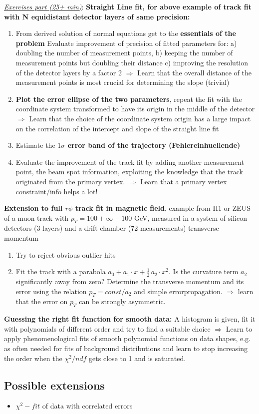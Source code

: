 \documentclass[12pt]{article}
\begin{document}
{\em \underline{Exercises part (25+ min)}}:
{\bf Straight Line fit, for above example of track fit
with N equidistant detector layers of same precision:}
\begin{enumerate}
\item From derived solution of normal equations get to the
{\bf essentials of the problem}
Evaluate improvement of precision of fitted parameters
for: a) doubling the number of measurement points,
b) keeping the number of measurement points but doubling
   their distance
c) improving the resolution of the detector layers by
   a factor 2 
$\Rightarrow$ Learn that the overall distance of the measurement 
points is most crucial for determining the slope (trivial)
\item
{\bf Plot the error ellipse of the two parameters}, repeat the
fit with the coordinate system transformed to have its
origin in the middle of the detector
$\Rightarrow$ Learn that the choice of the coordinate
system origin has a large impact on the correlation of
the intercept and slope of the straight line fit
\item
Estimate the {\bf $1\sigma$ error band of the trajectory 
(Fehlereinhuellende) }
\item 
Evaluate the improvement of the track fit by adding
another measurement point, the beam spot information,
exploiting the knowledge that the track originated
from the primary vertex.
$\Rightarrow$ Learn that a primary vertex constraint/info
helps a lot!
\end{enumerate}
{\bf Extension to full $r\phi$ track fit in magnetic field}, example
from H1 or ZEUS of a muon track with $p_T = 100+\infty - 100$ GeV,
measured in a system of silicon detectors (3 layers) and
a drift chamber (72 measurements)  
transverse momentum
\begin{enumerate}
\item
Try to reject obvious outlier hits
\item
Fit the track with a parabola
$a_0 + a_1 \cdot x + \frac{1}{2} \, a_2 \cdot x^2$.
Is the curvature term $a_2$ significantly
away from zero?
Determine the
transverse momentum and its error
using the relation $p_T = const/a_2$ and simple
errorpropagation.
$\Rightarrow$ learn that the error on $p_T$ can
be strongly asymmetric.
\end{enumerate}
%
{\bf Guessing the right fit function for smooth data:}
A histogram is given, fit it with polynomials of
different order and try to find a suitable choice
$\Rightarrow$ Learn to apply phenomenological
fits of smooth polynomial functions on data shapes,
e.g. as often needed for fits of background 
distributions and learn to stop increasing
the order when the $\chi^2/ndf$ gets close to 1
and is saturated.
%
%
\subsection{Possible extensions}
\begin{itemize}
\item
$\chi^2-fit$ of data with correlated errors 
\end{itemize}
%
%
%
%
%
%
%
%
\end{document}
